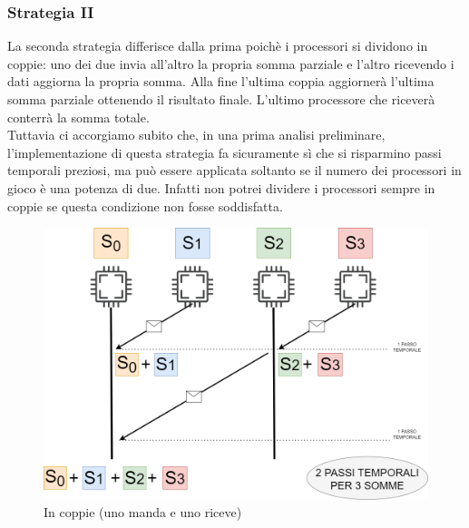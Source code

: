 \documentclass{article}
\begin{document}
\subsubsection{Strategia II}
    La seconda strategia differisce dalla prima poichè i processori si dividono in coppie: uno dei due invia all'altro la propria somma parziale e l'altro ricevendo i dati aggiorna la propria somma.
    Alla fine l'ultima coppia aggiornerà l'ultima somma parziale ottenendo il risultato finale.
    L'ultimo processore che riceverà conterrà la somma totale.\\
    Tuttavia ci accorgiamo subito che, in una prima analisi preliminare, l'implementazione di questa strategia fa sicuramente sì che si risparmino passi temporali preziosi, ma può essere applicata soltanto se il numero dei processori in gioco è una potenza di due. Infatti non potrei dividere i processori sempre in coppie se questa condizione non fosse soddisfatta.
\begin{figure}
    \centering
    \includegraphics[width=1\linewidth]{strategia_II.drawio.png}
    \caption{In coppie (uno manda e uno riceve)}
    \label{fig:enter-label}
\end{figure}
\end{document}
